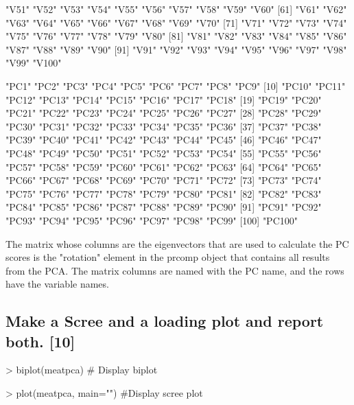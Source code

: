 \documentclass[letterpaper]{article}
\begin{document}
\begin{Schunk}
\begin{Soutput}
 [51] "V51"  "V52"  "V53"  "V54"  "V55"  "V56"  "V57"  "V58"  "V59"  "V60" 
 [61] "V61"  "V62"  "V63"  "V64"  "V65"  "V66"  "V67"  "V68"  "V69"  "V70" 
 [71] "V71"  "V72"  "V73"  "V74"  "V75"  "V76"  "V77"  "V78"  "V79"  "V80" 
 [81] "V81"  "V82"  "V83"  "V84"  "V85"  "V86"  "V87"  "V88"  "V89"  "V90" 
 [91] "V91"  "V92"  "V93"  "V94"  "V95"  "V96"  "V97"  "V98"  "V99"  "V100"
\end{Soutput}
\begin{Soutput}
  [1] "PC1"   "PC2"   "PC3"   "PC4"   "PC5"   "PC6"   "PC7"   "PC8"   "PC9"  
 [10] "PC10"  "PC11"  "PC12"  "PC13"  "PC14"  "PC15"  "PC16"  "PC17"  "PC18" 
 [19] "PC19"  "PC20"  "PC21"  "PC22"  "PC23"  "PC24"  "PC25"  "PC26"  "PC27" 
 [28] "PC28"  "PC29"  "PC30"  "PC31"  "PC32"  "PC33"  "PC34"  "PC35"  "PC36" 
 [37] "PC37"  "PC38"  "PC39"  "PC40"  "PC41"  "PC42"  "PC43"  "PC44"  "PC45" 
 [46] "PC46"  "PC47"  "PC48"  "PC49"  "PC50"  "PC51"  "PC52"  "PC53"  "PC54" 
 [55] "PC55"  "PC56"  "PC57"  "PC58"  "PC59"  "PC60"  "PC61"  "PC62"  "PC63" 
 [64] "PC64"  "PC65"  "PC66"  "PC67"  "PC68"  "PC69"  "PC70"  "PC71"  "PC72" 
 [73] "PC73"  "PC74"  "PC75"  "PC76"  "PC77"  "PC78"  "PC79"  "PC80"  "PC81" 
 [82] "PC82"  "PC83"  "PC84"  "PC85"  "PC86"  "PC87"  "PC88"  "PC89"  "PC90" 
 [91] "PC91"  "PC92"  "PC93"  "PC94"  "PC95"  "PC96"  "PC97"  "PC98"  "PC99" 
[100] "PC100"
\end{Soutput}
\end{Schunk}

The matrix whose columns are the eigenvectors that are used to calculate the PC scores is the "rotation" element in the prcomp object that contains all results from the PCA. The matrix columns are named with the PC name, and the rows have the variable names.

\subsection {Make a Scree and a loading plot and report both. [10]}

\begin{Schunk}
\begin{Sinput}
> biplot(meatpca) # Display biplot
\end{Sinput}
\end{Schunk}
\begin{Schunk}
\begin{Sinput}
> plot(meatpca, main="") #Display scree plot
\end{Sinput}
\end{Schunk}
\end{document}
